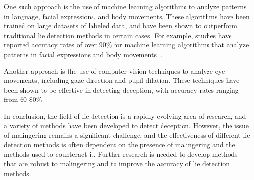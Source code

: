 \documentclass[onecolumn, compsoc,10pt]{IEEEtran}
\def\METHODS{Online Methods\xspace}
\begin{document}
One such approach is the use of machine learning algorithms to analyze patterns in language, facial expressions, and body movements. These algorithms have been trained on large datasets of labeled data, and have been shown to outperform traditional lie detection methods in certain cases. For example, studies have reported accuracy rates of over 90\% for machine learning algorithms that analyze patterns in facial expressions and body movements~\cite{Ekman1992,Yu2018}.

Another approach is the use of computer vision techniques to analyze eye movements, including gaze direction and pupil dilation. These techniques have been shown to be effective in detecting deception, with accuracy rates ranging from 60-80\%~\cite{Ducharme2017,Granziero2019}.

In conclusion, the field of lie detection is a rapidly evolving area of research, and a variety of methods have been developed to detect deception. However, the issue of malingering remains a significant challenge, and the effectiveness of different lie detection methods is often dependent on the presence of malingering and the methods used to counteract it. Further research is needed to develop methods that are robust to malingering and to improve the accuracy of lie detection methods.










\end{document}
